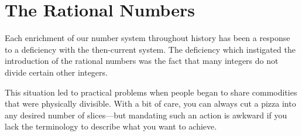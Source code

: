 \section{The Rational Numbers}
\label{sec:rationals}

Each enrichment of our number system throughout history has been a response to a deficiency with the then-current system.  The deficiency which instigated the introduction of the rational numbers was the fact that many integers do not divide certain other integers.

This situation led to practical problems when people began to share commodities that were physically divisible.  With a bit of care, you can always cut a pizza into any desired number of slices---but mandating such an action is awkward if you lack the terminology to describe what you want to achieve.

